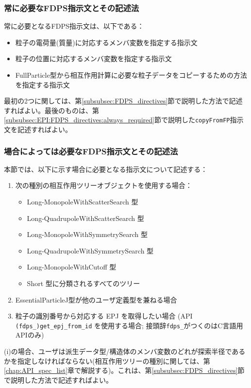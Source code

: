 \subsubsection{常に必要なFDPS指示文とその記述法}
常に必要となるFDPS指示文は、以下である：
\begin{itemize}[leftmargin=*,itemsep=-1ex]
\item 粒子の電荷量(質量)に対応するメンバ変数を指定する指示文
\item 粒子の位置に対応するメンバ変数を指定する指示文
\item FullParticle型から相互作用計算に必要な粒子データをコピーするための方法を指定する指示文
\end{itemize}
最初の2つに関しては、第\ref{subsubsec:FDPS_directives}節で説明した方法で記述すればよい。最後のものは、第\ref{subsubsec:EPI:FDPS_directives:always_required}節で説明した\texttt{copyFromFP}指示文を記述すればよい。

\subsubsection{場合によっては必要なFDPS指示文とその記述法}
\label{sec:EPJ:FDPS_directives_required_in_specific_cases}
本節では、以下に示す場合に必要となる指示文について記述する：
\begin{enumerate}[leftmargin=*,itemsep=-1ex,label=(\roman*)]
\item 次の種別の相互作用ツリーオブジェクトを使用する場合：
\begin{itemize}
\item Long-MonopoleWithScatterSearch 型
\item Long-QuadrupoleWithScatterSearch 型
\item Long-MonopoleWithSymmetrySearch 型
\item Long-QuadrupoleWithSymmetrySearch 型
\item Long-MonopoleWithCutoff 型
\item Short 型に分類されるすべてのツリー
\end{itemize}
\item EssentialParticleJ型が他のユーザ定義型を兼ねる場合
\item 粒子の識別番号から対応する EPJ を取得したい場合 (API \texttt{(fdps\_)get\_epj\_from\_id} を使用する場合; 接頭辞\texttt{fdps\_}がつくのはC言語用APIのみ)
\end{enumerate}

(i)の場合、ユーザは派生データ型/構造体のメンバ変数のどれが探索半径であるかを指定しなければならない(相互作用ツリーの種別に関しては、第\ref{chap:API_spec_list}章で解説する)。これは、第\ref{subsubsec:FDPS_directives}節で説明した方法で記述すればよい。

